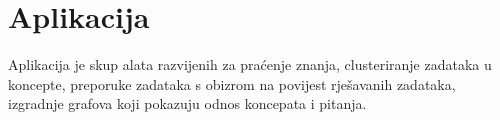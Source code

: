 \chapter{Aplikacija}

	Aplikacija je skup alata razvijenih za praćenje znanja, clusteriranje zadataka u koncepte, preporuke zadataka s obizrom na povijest rješavanih zadataka, izgradnje grafova koji pokazuju odnos koncepata i pitanja.
	
	
	\begin{comment}
		Knowledge tracing
		- bayesian knowledge tracing- input su dataset za određeni "ispit",pragovi za cutoff,gauss,bkt -potencijalno slideri sa listenerima pa se prema tome mijenja graf?
			-output: graf koji pokazuje odnos koncepata (usmjereni graf)
			-prvo treba proci vrijeme dok se izracunaju parametri za bkt -bilo bi dobro imati mogucnost sejvanja generiranih parametara u neki pikl?
			-kod procesuiranja google formsa u dataset treba dati pravilan redoslijed naziva koncepata
		OGRANIČENJA- u datasetu svi korisnici moraju rijesiti sve zadatke i to istim redoslijedom
		
		ExRec-
		KT dio- moguce izvrsiti samo jednom za neki dataset i onda spremiti parametre u neki pikl koji se moze kasnije kako bi bilo brze
		Izracun matrice relevantnosti preko SAKT-a se isto moze jednom izvrsiti i onda se objekt klase "PersonalCandidates" ili sama matrica mogu spremiti kao pikl i koristiti kasnije, mozda bolje matrica jer za PersonalCandidates postoje varijabilni argumenti
		PersonalCandidates- ima mogucnost razlicith normalizacijskih funkcija i funkcija praga te same vrijednosti praga

		Recommmendation system ima ulaz parametre dobivene iz kt dijela, student traces (tu bi moglo staviti da se upisu zadaci i tocno/netocno ili da se ucita iz nekog fajla pa da se onda da preporuku i opciju da li da se radi samo sakt preporuka ili sakt + rs)
		
		Clustering
		-k-mediods - uz input min,max broj koncepata i ulazni dataset daje procjenu koliko zapravo koncepata ima
					-uz dani broj koncepata clusterira pitanja u različite koncepte
					-ograničenja su jednaka kao za bkt
					
		-zvonimir
		
		-bkt izgradnja grafa gdje se pitanja gledaju kao koncepti (to bi vjerojatno trebalo preraditi i trebalo bi se igrati sa parametrima)
			-trenutno se za izgradnju prima googleforms file, treba generalizirati za opceniti dataset
			-treba promijena funkcija get_student_concept_mastery
		-pomocne skripte- obrada google formsa, generiranje umjetnog dataseta
		
	\end{comment}

